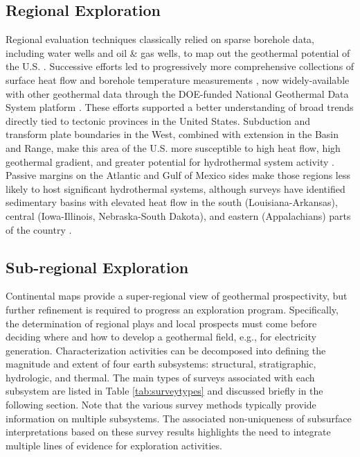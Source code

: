\subsection{Regional Exploration}
Regional evaluation techniques classically relied on sparse borehole data, including water wells and oil \& gas wells, to map out the geothermal potential of the U.S. \citep{kehle_aapg_1970}. Successive efforts led to progressively more comprehensive collections of surface heat flow and borehole temperature measurements \citep{blackwell_temperature-at-depth_2011, blackwell_heat_1990, muffler_assessment_1979, sorey_low-temperature_1983, wisian_heat_1999}, now widely-available with other geothermal data through the DOE-funded National Geothermal Data System platform \citep{anderson_national_2013}. These efforts supported a better understanding of broad trends directly tied to tectonic provinces in the United States. Subduction and transform plate boundaries in the West, combined with extension in the Basin and Range, make this area of the U.S. more susceptible to high heat flow, high geothermal gradient, and greater potential for hydrothermal system activity \citep{mariner_low-temperature_1983}. Passive margins on the Atlantic and Gulf of Mexico sides make those regions less likely to host significant hydrothermal systems, although surveys have identified sedimentary basins with elevated heat flow in the south (Louisiana-Arkansas), central (Iowa-Illinois, Nebraska-South Dakota), and eastern (Appalachians) parts of the country \citep{blackwell_geothermal_1995, sorey_low-temperature_1983}.

\subsection{Sub-regional Exploration}
Continental maps provide a super-regional view of geothermal prospectivity, but further refinement is required to progress an exploration program. Specifically, the determination of regional plays and local prospects must come before deciding where and how to develop a geothermal field, e.g., for electricity generation. Characterization activities can be decomposed into defining the magnitude and extent of four earth subsystems: structural, stratigraphic, hydrologic, and thermal. The main types of surveys associated with each subsystem are listed in Table \ref{tab:surveytypes} and discussed briefly in the following section. Note that the various survey methods typically provide information on multiple subsystems. The associated non-uniqueness of subsurface interpretations based on these survey results highlights the need to integrate multiple lines of evidence for exploration activities. 

